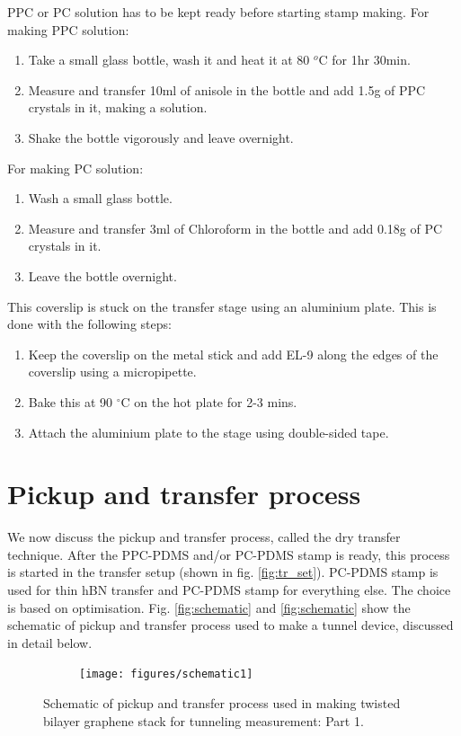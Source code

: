 PPC or PC solution has to be kept ready before starting stamp making. For making PPC solution: 
\begin{enumerate}
	\item Take a small glass bottle, wash it and heat it at 80 $^o$C for 1hr 30min. \item Measure and transfer 10ml of anisole in the bottle and add 1.5g of PPC crystals in it, making a solution.
	\item Shake the bottle vigorously and leave overnight.
\end{enumerate}
For making PC solution:
\begin{enumerate}
	\item Wash a small glass bottle. 
	\item Measure and transfer 3ml of Chloroform in the bottle and add 0.18g of PC crystals in it.
	\item Leave the bottle overnight.
\end{enumerate}
This coverslip is stuck on the transfer stage using an aluminium plate. This is done with the following steps:
\begin{enumerate}
	\item Keep the coverslip on the metal stick and add EL-9 along the edges of the coverslip using a micropipette.
	\item Bake this at 90 $^{\circ}$C on the hot plate for 2-3 mins.
	\item Attach the aluminium plate to the stage using double-sided tape.
\end{enumerate}

\section{Pickup and transfer process}
\label{section:f}

We now discuss the pickup and transfer process, called the dry transfer technique. \cite{Kim16,Wang614} After the PPC-PDMS and/or PC-PDMS stamp is ready, this process is started in the transfer setup (shown in fig. \ref{fig:tr_set}). PC-PDMS stamp is used for thin hBN transfer and PC-PDMS stamp for everything else. The choice is based on optimisation. Fig. \ref{fig:schematic} and \ref{fig:schematic} show the schematic of pickup and transfer process used to make a tunnel device, discussed in detail below.

\begin{figure}[H]
	\centering
	\begin{subfigure}{\linewidth}
		\centering
		\texttt{[image: figures/schematic1]}
	\end{subfigure}
	\caption{Schematic of pickup and transfer process used in making twisted bilayer graphene stack for tunneling measurement: Part 1.}
	\label{fig:schematic1}
\end{figure}

